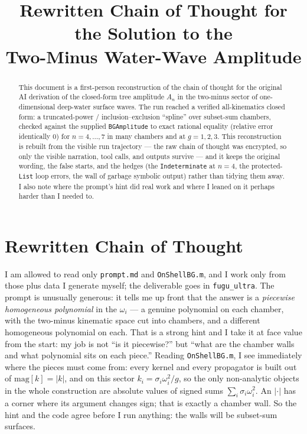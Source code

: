 \documentclass{article}
\title{Rewritten Chain of Thought for the Solution to the\\
Two-Minus Water-Wave Amplitude}
\author{}
\date{}
\begin{document}
\maketitle

\begin{abstract}
This document is a first-person reconstruction of the chain of thought for the
original AI derivation of the closed-form tree amplitude $A_n$ in the two-minus
sector of one-dimensional deep-water surface waves. The run reached a verified
all-kinematics closed form: a truncated-power / inclusion--exclusion ``spline''
over subset-sum chambers, checked against the supplied \texttt{BGAmplitude} to
exact rational equality (relative error identically $0$) for $n=4,\dots,7$ in
many chambers and at $g=1,2,3$. This reconstruction is rebuilt from the visible
run trajectory --- the raw chain of thought was encrypted, so only the visible
narration, tool calls, and outputs survive --- and it keeps the original
wording, the false starts, and the hedges (the \texttt{Indeterminate} at $n=4$,
the protected-\texttt{List} loop errors, the wall of garbage symbolic output)
rather than tidying them away. I also note where the prompt's hint did real work
and where I leaned on it perhaps harder than I needed to.
\end{abstract}

\section*{Rewritten Chain of Thought}

I am allowed to read only \texttt{prompt.md} and \texttt{OnShellBG.m}, and I work
only from those plus data I generate myself; the deliverable goes in
\texttt{fugu\_ultra}. The prompt is unusually generous: it tells me up front that
the answer is a \emph{piecewise homogeneous polynomial} in the
$\omega_i$ --- a genuine polynomial on each chamber, with the two-minus kinematic
space cut into chambers, and a different homogeneous polynomial on each. That is
a strong hint and I take it at face value from the start: my job is not ``is it
piecewise?'' but ``what are the chamber walls and what polynomial sits on each
piece.'' Reading \texttt{OnShellBG.m}, I see immediately where the pieces must
come from: every kernel and every propagator is built out of
$\mathrm{mag}[k]=|k|$, and on this sector $k_i=\sigma_i\omega_i^2/g$, so the only
non-analytic objects in the whole construction are absolute values of signed sums
$\sum_i\sigma_i\omega_i^2$. An $|\cdot|$ has a corner where its argument changes
sign; that is exactly a chamber wall. So the hint and the code agree before I run
anything: the walls will be subset-sum surfaces.
\end{document}
